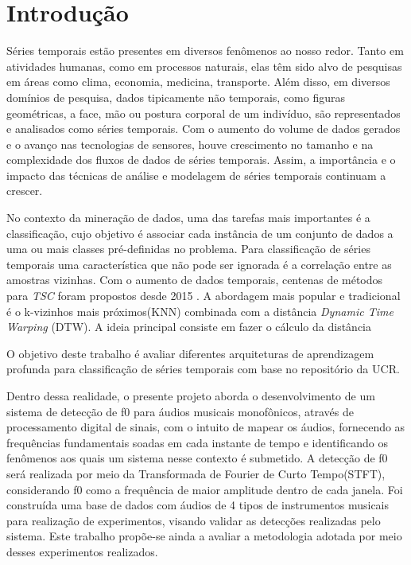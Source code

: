 
\chapter{Introdução} %

Séries temporais estão presentes em diversos fenômenos ao nosso redor. Tanto em atividades humanas, como em processos naturais, elas têm sido alvo de pesquisas em áreas como clima, economia, medicina, transporte. Além disso, em diversos domínios de pesquisa, dados tipicamente não temporais, como figuras geométricas, a face, mão ou postura corporal de um indivíduo, são representados e analisados como séries temporais. Com o aumento do volume de dados gerados e o avanço nas tecnologias de sensores, houve crescimento no tamanho e na complexidade dos fluxos de dados de séries temporais. Assim, a importância e o impacto das técnicas de análise e modelagem de séries temporais continuam a crescer. 

No contexto da mineração de dados, uma das tarefas mais importantes é a classificação, cujo objetivo é associar cada instância de um conjunto de dados a uma ou mais classes pré-definidas no problema. Para classificação de séries temporais uma característica que não pode ser ignorada é a correlação entre as amostras vizinhas. Com o aumento de dados temporais, centenas de métodos para \textit{TSC} foram propostos desde 2015 \cite{Bagnall2017}. A abordagem mais popular e tradicional é o k-vizinhos mais próximos(KNN) combinada com a distância \textit{Dynamic Time Warping} (DTW). A ideia principal consiste em fazer o cálculo da distância 

O objetivo deste trabalho é avaliar diferentes arquiteturas de aprendizagem profunda para classificação de séries temporais com base no repositório da UCR.

Dentro dessa realidade, o presente projeto aborda o desenvolvimento de um sistema de detecção de f0 para áudios musicais monofônicos, através de processamento digital de sinais, com o intuito de mapear os áudios, fornecendo as frequências fundamentais soadas em cada instante de tempo e identificando os fenômenos aos quais um sistema nesse contexto é submetido. A detecção de f0 será realizada por meio da Transformada de Fourier de Curto Tempo(STFT), considerando f0 como a frequência de maior amplitude dentro de cada janela. Foi construída uma base de dados com áudios de 4 tipos de instrumentos musicais para realização de experimentos, visando validar as detecções realizadas pelo sistema. Este trabalho propõe-se ainda a avaliar a metodologia adotada por meio desses experimentos realizados. 
